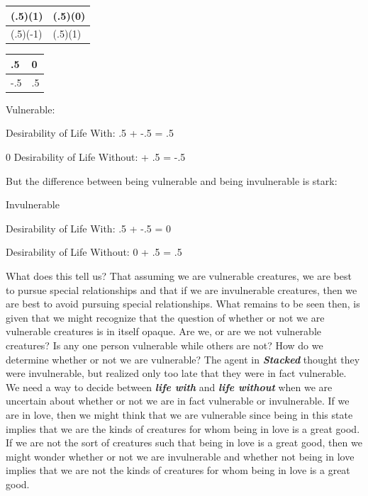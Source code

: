 \documentclass[
  letterpaper,
  DIV=11,
  numbers=noendperiod]{scrartcl}
\newcounter{none} %
\begin{document}
{\def\LTcaptype{none} %
\begin{longtable}[]{@{}ll@{}}
\toprule\noalign{}
(.5)(1) & (.5)(0) \\
\midrule\noalign{}
\endhead
\bottomrule\noalign{}
\endlastfoot
(.5)(-1) & (.5)(1) \\
\end{longtable}
}

{\def\LTcaptype{none} %
\begin{longtable}[]{@{}ll@{}}
\toprule\noalign{}
.5 & 0 \\
\midrule\noalign{}
\endhead
\bottomrule\noalign{}
\endlastfoot
-.5 & .5 \\
\end{longtable}
}

Vulnerable:

Desirability of Life With: .5 + -.5 = .5

0 Desirability of Life Without: + .5 = -.5

But the difference between being vulnerable and being invulnerable is
stark:

Invulnerable

Desirability of Life With: .5 + -.5 = 0

Desirability of Life Without: 0 + .5 = .5

What does this tell us? That assuming we are vulnerable creatures, we
are best to pursue special relationships and that if we are invulnerable
creatures, then we are best to avoid pursuing special relationships.
What remains to be seen then, is given that we might recognize that the
question of whether or not we are vulnerable creatures is in itself
opaque. Are we, or are we not vulnerable creatures? Is any one person
vulnerable while others are not? How do we determine whether or not we
are vulnerable? The agent in \emph{\textbf{Stacked}} thought they were
invulnerable, but realized only too late that they were in fact
vulnerable. We need a way to decide between \emph{\textbf{life with}}
and \emph{\textbf{life without}} when we are uncertain about whether or
not we are in fact vulnerable or invulnerable. If we are in love, then
we might think that we are vulnerable since being in this state implies
that we are the kinds of creatures for whom being in love is a great
good. If we are not the sort of creatures such that being in love is a
great good, then we might wonder whether or not we are invulnerable and
whether not being in love implies that we are not the kinds of creatures
for whom being in love is a great good.
\end{document}
